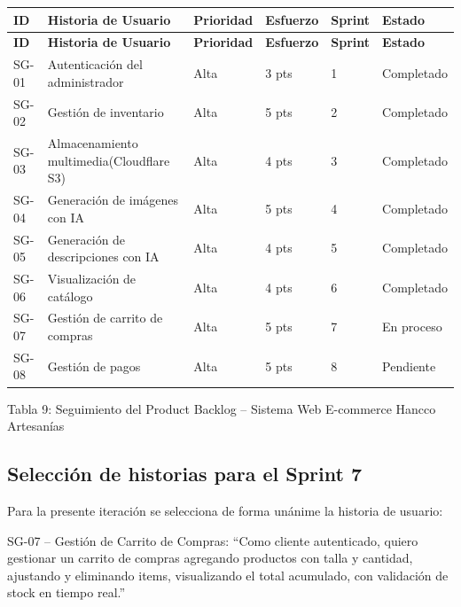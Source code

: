 \documentclass[12pt,a4paper]{article}
\begin{document}
{\small
\begin{longtable}{p{1.2cm} p{6.8cm} p{1.6cm} p{1.8cm} p{1.4cm} p{2.2cm}}
\toprule
\textbf{ID} & \textbf{Historia de Usuario} & \textbf{Prioridad} & \textbf{Esfuerzo} & \textbf{Sprint} & \textbf{Estado} \\
\midrule
\endfirsthead

\toprule
\textbf{ID} & \textbf{Historia de Usuario} & \textbf{Prioridad} & \textbf{Esfuerzo} & \textbf{Sprint} & \textbf{Estado} \\
\midrule
\endhead

\bottomrule
\endlastfoot

SG-01 & Autenticación del administrador & Alta & 3 pts & 1 & Completado \\
SG-02 & Gestión de inventario & Alta & 5 pts & 2 & Completado \\
SG-03 & Almacenamiento multimedia(Cloudflare S3) & Alta & 4 pts & 3 & Completado \\
SG-04 & Generación de imágenes con IA & Alta & 5 pts & 4 & Completado \\
SG-05 & Generación de descripciones con IA & Alta & 4 pts & 5 & Completado \\
SG-06 & Visualización de catálogo & Alta & 4 pts & 6 & Completado \\
SG-07 & Gestión de carrito de compras & Alta & 5 pts & 7 & En proceso \\
SG-08 & Gestión de pagos & Alta & 5 pts & 8 & Pendiente \\

\end{longtable}
}

\begin{center}
\small Tabla 9: Seguimiento del Product Backlog -- Sistema Web E-commerce Hancco Artesanías
\end{center}

\subsection*{Selección de historias para el Sprint 7}

Para la presente iteración se selecciona de forma unánime la historia de usuario:

SG-07 -- Gestión de Carrito de Compras: ``Como cliente autenticado, quiero gestionar un carrito de compras agregando productos con talla y cantidad, ajustando y eliminando items, visualizando el total acumulado, con validación de stock en tiempo real.''
\end{document}
